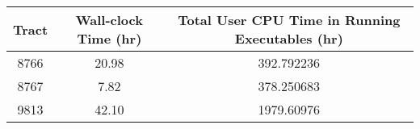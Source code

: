 \begin{table}
	\caption{The wall-clock time and total execution time in each tract.
    See \S\ref{sect:deviation-drp-00-05} for an explanation of the longer wall-clock time for tract 8766.}
	\label{tab:runtime}
	\small
	\begin{longtable}{ccc}
		\hline\hline
		\textbf{Tract}                                           &
		\textbf{Wall-clock Time (hr)}                            &
		\textbf{Total User CPU Time in Running Executables (hr)} \\
		\hline\hline
		8766 & 20.98 & 392.792236 \\
		8767 &  7.82 & 378.250683 \\
		9813 & 42.10 & 1979.60976 \\
		\hline\hline
	\end{longtable}
\end{table}

